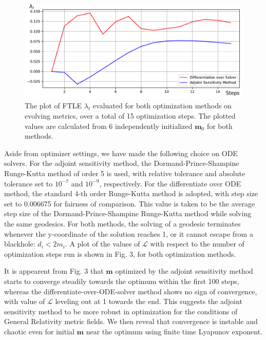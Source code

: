 \documentclass[conference]{IEEEtran}
\begin{document}
\begin{figure}[htbp]
\centerline{\includegraphics[width=\columnwidth]{FTLE_BSSN.pdf}}
\caption{The plot of FTLE $\lambda_t$ evaluated for both optimization methods on evolving metrics,
over a total of 15 optimization steps. 
The plotted values are calculated from 6 independently 
initialized $\mathbf{m}_0$ for both methods.}
\label{fig}
\end{figure}

Aside from optimizer settings, we have made the following choice on 
ODE solvers. For the adjoint sensitivity method, the 
Dormand-Prince-Shampine Runge-Kutta method of order 5 \cite{dpsrk} is 
used, with relative tolerance and absolute tolerance set to 
$10^{-7}$ and $10^{-9}$, respectively. For the differentiate over ODE method, the standard 4-th 
order Runge-Kutta method is adopted, with step size set to 0.006675 for 
fairness of comparison. This value is taken to be the average step 
size of the Dormand-Prince-Shampine Runge-Kutta method while 
solving the same geodesics. For both methods, the solving of 
a geodesic terminates whenever the y-coordinate of the solution 
reaches 1, or it cannot escape from a blackhole: $d_i < 2m_i$.
A plot of the values of 
$\mathcal{L}$ with respect to the number of optimization steps run 
is shown in Fig. 3, for both optimization methods.


It is appearent from Fig. 3 that $\mathbf{m}$ optimized by the adjoint 
sensitivity method starts to converge steadily towards the optimum 
within the first 100 steps, whereas the differentiate-over-ODE-solver 
method shows no sign of convergence, with value of $\mathcal{L}$ leveling out at 1 towards the end. This suggests the adjoint sensitivity 
method to be more robust in optimization for the conditions 
of General Relativity metric fields. We then reveal that convergence is 
instable and chaotic even for initial $\mathbf{m}$ near the optimum using 
finite time Lyapunov exponent.
\end{document}
